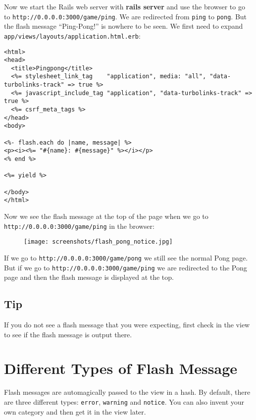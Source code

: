 \documentclass[a4paper]{book}
\begin{document}
Now we start the Rails web server with \textbf{rails server} and use the browser to go to \texttt{http://0.0.0.0:3000/game/ping}. We are redirected from \texttt{ping} to \texttt{pong}. But the flash message “Ping-Pong!” is nowhere to be seen. We first need to expand \texttt{app/views/layouts/application.html.erb}:

\begin{shaded}\begin{verbatim}
<html>
<head>
  <title>Pingpong</title>
  <%= stylesheet_link_tag    "application", media: "all", "data-turbolinks-track" => true %>
  <%= javascript_include_tag "application", "data-turbolinks-track" => true %>
  <%= csrf_meta_tags %>
</head>
<body>

<%- flash.each do |name, message| %>
<p><i><%= "#{name}: #{message}" %></i></p>
<% end %>

<%= yield %>

</body>
</html>
\end{verbatim}\end{shaded}

Now we see the flash message at the top of the page when we go to \texttt{http://0.0.0.0:3000/game/ping} in the browser:

\begin{figure}[htbp]
\centering
\texttt{[image: screenshots/flash\_pong\_notice.jpg]}
\end{figure}

If we go to \texttt{http://0.0.0.0:3000/game/pong} we still see the normal Pong page. But if we go to \texttt{http://0.0.0.0:3000/game/ping} we are redirected to the Pong page and then the flash message is displayed at the top.

\subsection{Tip}\label{tip-3}

If you do not see a flash message that you were expecting, first check in the view to see if the flash message is output there.

\section{Different Types of Flash Message}\label{different-types-of-flash-message}

Flash messages are automagically passed to the view in a hash. By default, there are three different types: \texttt{error}, \texttt{warning} and \texttt{notice}. You can also invent your own category and then get it in the view later.
\end{document}
